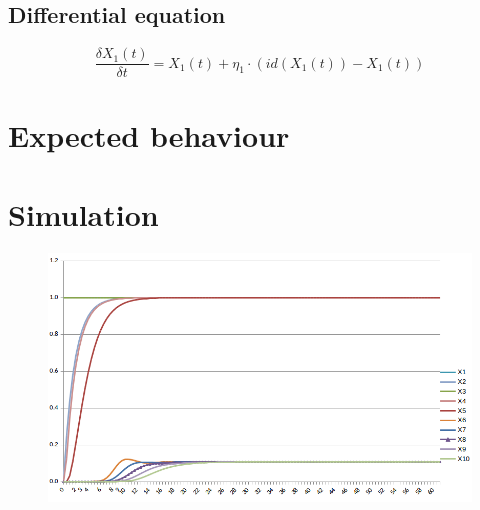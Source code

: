 \documentclass[a4paper]{article}
\begin{document}
\subsection{Differential equation}

\begin{equation}
\frac{\delta X_{1}(t)}{\delta t} = X_{1}(t) + \eta_{1} \cdot ( id(X_{1}(t)) - X_{1}(t))
\end{equation}

\section{Expected behaviour}






\section{Simulation}

\begin{figure}[!htbp]
\center
\includegraphics[width=\textwidth]{res/img/numerical_representation}
\end{figure}




\end{document}
